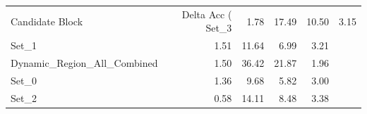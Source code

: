\begin{tabular}{lrrrr}
\toprule
Candidate Block & Delta Acc (%
\midrule
Set_3 & 1.78 & 17.49 & 10.50 & 3.15 \\
Set_1 & 1.51 & 11.64 & 6.99 & 3.21 \\
Dynamic_Region_All_Combined & 1.50 & 36.42 & 21.87 & 1.96 \\
Set_0 & 1.36 & 9.68 & 5.82 & 3.00 \\
Set_2 & 0.58 & 14.11 & 8.48 & 3.38 \\
\bottomrule
\end{tabular}
